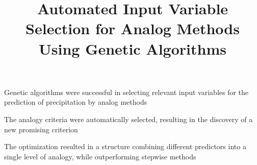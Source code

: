 \documentclass[draft]{agujournal2019}
\begin{document}
\title{Automated Input Variable Selection for Analog Methods Using Genetic Algorithms}





\begin{keypoints}
\item Genetic algorithms were successful in selecting relevant input variables for the prediction of precipitation by analog methods
\item The analogy criteria were automatically selected, resulting in the discovery of a new promising criterion
\item The optimization resulted in a structure combining different predictors into a single level of analogy, while outperforming stepwise methods
\end{keypoints}
\end{document}
